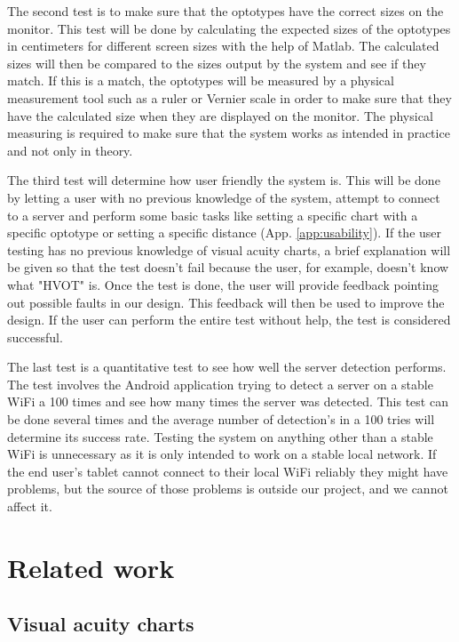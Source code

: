 \documentclass[12pt,a4paper,notitlepage]{report}
\begin{document}
The second test is to make sure that the optotypes have the correct sizes on the monitor. This test will be done by calculating the expected sizes of the optotypes in centimeters for different screen sizes with the help of Matlab. The calculated sizes will then be compared to the sizes output by the system and see if they match. If this is a match, the optotypes will be measured by a physical measurement tool such as a ruler or Vernier scale in order to make sure that they have the calculated size when they are displayed on the monitor. The physical measuring is required to make sure that the system works as intended in practice and not only in theory.

The third test will determine how user friendly the system is. This will be done by letting a user with no previous knowledge of the system, attempt to connect to a server and perform some basic tasks like setting a specific chart with a specific optotype or setting a specific distance (App. \ref{app:usability}). If the user testing has no previous knowledge of visual acuity charts, a brief explanation will be given so that the test doesn't fail because the user, for example, doesn't know what "HVOT" is. Once the test is done, the user will provide feedback pointing out possible faults in our design. This feedback will then be used to improve the design. If the user can perform the entire test without help, the test is considered successful.

The last test is a quantitative test to see how well the server detection performs. The test involves the Android application trying to detect a server on a stable WiFi a 100 times and see how many times the server was detected. This test can be done several times and the average number of detection's in a 100 tries will determine its success rate. Testing the system on anything other than a stable WiFi is unnecessary as it is only intended to work on a stable local network. If the end user's tablet cannot connect to their local WiFi reliably they might have problems, but the source of those problems is outside our project, and we cannot affect it.

\section{Related work}

\subsection{Visual acuity charts}
\end{document}
